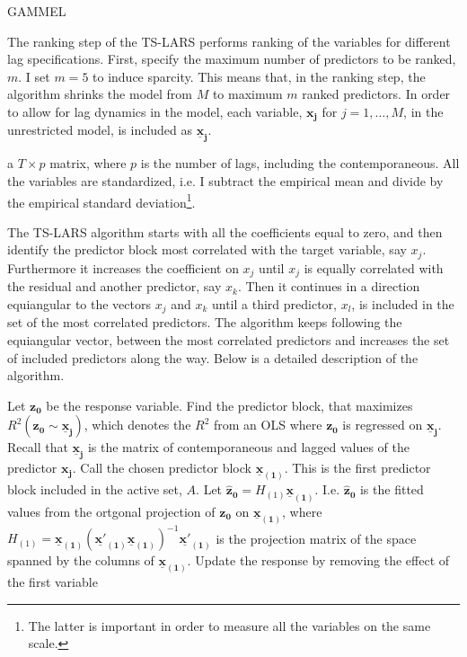 GAMMEL

The ranking step of the TS-LARS performs ranking of the variables for different lag specifications. First, specify the maximum number of predictors to be ranked, $m$. I set $m = 5$ to induce sparcity. This means that, in the ranking step, the algorithm shrinks the model from $M$ to maximum $m$ ranked predictors. In order to allow for lag dynamics in the model, each variable, $\mathbf{x_j}$ for $j = 1, \ldots, M$, in the unrestricted model, is included as $\mathbf{\underline{x}_j}$.

a $T \times p$ matrix, where $p$ is the number of lags, including the contemporaneous. All the variables are standardized, i.e. I subtract the  empirical mean and divide by the empirical standard deviation\footnote{The latter is important in order to measure all the variables on the same scale.}.


The TS-LARS algorithm starts with all the coefficients equal to zero, and then identify the predictor block most correlated with the target variable, say $x_j$. Furthermore it increases the coefficient on $x_j$ until $x_j$ is equally correlated with the residual and another predictor, say $x_k$. Then it continues in a direction equiangular to the vectors $x_j$ and $x_k$ until a third predictor, $x_l$, is included in the set of the most correlated predictors. The algorithm keeps following the equiangular vector, between the most correlated predictors and increases the set of included predictors along the way. Below is a detailed description of the algorithm.



Let $\mathbf{z_0}$ be the response variable. Find the predictor block, that maximizes $R^2(\mathbf{z_0} \sim \mathbf{\underline{x}_j})$, which denotes the $R^2$ from an OLS where $\mathbf{z_0}$ is regressed on $\mathbf{\underline{x}_j}$. Recall that $\mathbf{\underline{x}_j}$ is the matrix of contemporaneous and lagged values of the predictor $\mathbf{x_j}$. Call the chosen predictor block $\mathbf{\underline{x}_{(1)}}$. This is the first predictor block included in the active set, $A$. Let $\mathbf{\hat{z}_0} = H_{(1)} \mathbf{\underline{x}_{(1)}}$. I.e. $\mathbf{\hat{z}_0}$ is the fitted values from the ortgonal projection of $\mathbf{z_0}$ on $\mathbf{\underline{x}_{(1)}}$, where $H_{(1)} = \mathbf{\underline{x}_{(1)}} (\mathbf{\underline{x'}_{(1)}} \mathbf{\underline{x}_{(1)}})^{-1} \mathbf{\underline{x'}_{(1)}}$ is the projection matrix of the space spanned by the columns of $\mathbf{\underline{x}_{(1)}}$. Update the response by removing the effect of the first variable

